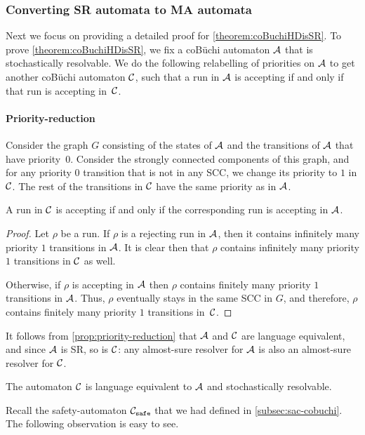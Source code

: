 \subsubsection*{Converting SR automata to MA automata}
Next we focus on providing a detailed proof for \cref{theorem:coBuchiHDisSR}.
\theoremcobuchisrtoma*
To prove \cref{theorem:coBuchiHDisSR}, we fix a coB\"uchi automaton $\mathcal{A}$ that is stochastically resolvable. We do the following relabelling of priorities on $\mathcal{A}$ to get another coB\"uchi automaton $\mathcal{C}$, such that a run in $\mathcal{A}$ is accepting if and only if that run is accepting in~$\mathcal{C}$. 
\paragraph*{Priority-reduction} Consider the graph $G$ consisting of the states of $\mathcal{A}$ and the transitions of $\mathcal{A}$ that have priority~$0$. Consider the strongly connected components of this graph, and for any priority $0$ transition that is not in any SCC, we change its priority to $1$ in $\mathcal{C}$. The rest of the transitions in $\mathcal{C}$ have the same priority as in $\mathcal{A}$.

\begin{proposition}\label{prop:priority-reduction}
A run in $\mathcal{C}$ is accepting if and only if the corresponding run is accepting in $\mathcal{A}$.
\end{proposition}
\begin{proof}
    Let $\rho$ be a run. If $\rho$ is a rejecting run in $\mathcal{A}$, then it contains infinitely many priority $1$ transitions in $\mathcal{A}$. It is clear then that $\rho$ contains infinitely many priority $1$ transitions in $\mathcal{C}$ as well. 
    
    Otherwise, if $\rho$ is accepting in $\mathcal{A}$ then $\rho$ contains finitely many priority $1$ transitions in $\mathcal{A}$. Thus, $\rho$ eventually stays in the same SCC in $G$, and therefore, $\rho$ contains finitely many priority $1$ transitions in~$\mathcal{C}$.
\end{proof}
It follows from \cref{prop:priority-reduction} that $\mathcal{A}$ and $\mathcal{C}$ are language equivalent, and since $\mathcal{A}$ is SR, so is $\mathcal{C}$: any almost-sure resolver for $\mathcal{A}$ is also an almost-sure resolver for $\mathcal{C}$.
\begin{corollary}\label{cor:lang-c-is-lang-a}
The automaton $\mathcal{C}$ is language equivalent to $\mathcal{A}$ and stochastically resolvable.
\end{corollary}

Recall the safety-automaton $\mathcal{C}_{\texttt{safe}}$ that we had defined in \cref{subsec:sac-cobuchi}. The following observation is easy to see.

